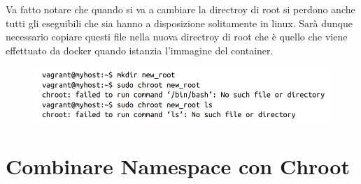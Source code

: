 Va fatto notare che quando si va a cambiare la directroy di root si perdono anche
tutti gli eseguibili che sia hanno a disposizione solitamente in linux. Sarà
dunque necessario copiare questi file nella nuova directroy di root che è
quello che viene effettuato da docker quando istanzia l'immagine del container.

\begin{figure}[H]
    \centering
    \includegraphics[width=\textwidth, keepaspectratio]{capitoli/os_security/imgs/root2.png}
\end{figure}

\section{Combinare Namespace con Chroot}

